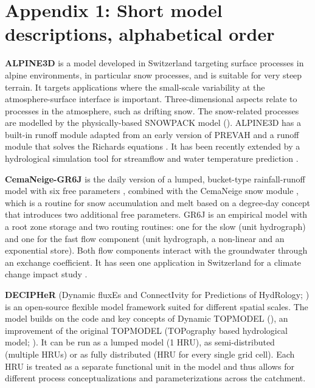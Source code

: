 \documentclass[10pt,a4paper]{article}
\begin{document}
\section*{Appendix 1: Short model descriptions, alphabetical order}
\label{appendix:1}

\textbf{ALPINE3D} \citep{Lehning_2006} is a model developed in Switzerland
targeting surface processes in alpine environments, in particular snow
processes, and is suitable for very steep terrain. It targets
applications where the small-scale variability at the atmosphere-surface
interface is important. Three-dimensional aspects relate to processes in
the atmosphere, such as drifting snow. The snow-related processes are
modelled by the physically-based SNOWPACK model (\citealt{Lehning2002,Bartelt_2002,Bartelt2002,Lehning_2002}).
ALPINE3D has a built-in runoff module adapted from an early version of
PREVAH \citep{Lehning_2006} and a runoff module that solves the Richards
equations \citep{Wever2017}. It has been recently extended by a
hydrological simulation tool for streamflow and water temperature
prediction \citep{Gallice_2016}.

\textbf{CemaNeige-GR6J} is the daily version of a lumped, bucket-type
rainfall-runoff model with six free parameters \citep{Pushpalatha2011},
combined with the CemaNeige snow module \citep{Valery2014a,Valery2014b}, which is a
routine for snow accumulation and melt based on a degree-day concept
that introduces two additional free parameters. GR6J is an empirical
model with a root zone storage and two routing routines: one for the
slow (unit hydrograph) and one for the fast flow component ({unit
hydrograph}, a non-linear and an exponential store). Both flow
components interact with the groundwater through an exchange
coefficient. It has seen one application in Switzerland for a climate
change impact study \citep{Keller2019a}.

\textbf{DECIPHeR} (Dynamic fluxEs and ConnectIvity for Predictions of
HydRology; \citealp{Coxon_2019}) is an open-source flexible model
framework suited for different spatial scales. The model builds on the
code and key concepts of Dynamic TOPMODEL (\citealp{Beven_2001}), an
improvement of the original TOPMODEL (TOPography based hydrological
model; \citealp{BEVEN_1979}). It can be run as a lumped model (1 HRU), as
semi-distributed (multiple HRUs) or as fully distributed (HRU for every
single grid cell). Each HRU is treated as a separate functional unit in
the model and thus allows for different process conceptualizations and
parameterizations across the catchment.
\end{document}
